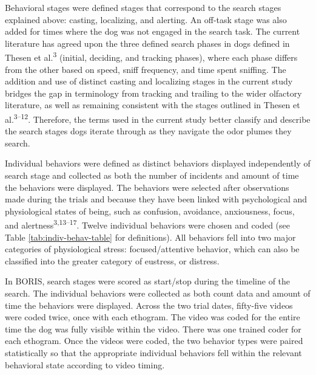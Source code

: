 \documentclass[
]{article}
\begin{document}
Behavioral stages were defined stages that correspond to the search stages explained above: casting, localizing, and alerting. An off-task stage was also added for times where the dog was not engaged in the search task. The current literature has agreed upon the three defined search phases in dogs defined in Thesen et al.\textsuperscript{3} (initial, deciding, and tracking phases), where each phase differs from the other based on speed, sniff frequency, and time spent sniffing. The addition and use of distinct casting and localizing stages in the current study bridges the gap in terminology from tracking and trailing to the wider olfactory literature, as well as remaining consistent with the stages outlined in Thesen et al.\textsuperscript{3--12}. Therefore, the terms used in the current study better classify and describe the search stages dogs iterate through as they navigate the odor plumes they search.

Individual behaviors were defined as distinct behaviors displayed independently of search stage and collected as both the number of incidents and amount of time the behaviors were displayed. The behaviors were selected after observations made during the trials and because they have been linked with psychological and physiological states of being, such as confusion, avoidance, anxiousness, focus, and alertness\textsuperscript{3,13--17}. Twelve individual behaviors were chosen and coded (see Table \ref{tab:indiv-behav-table} for definitions). All behaviors fell into two major categories of physiological stress: focused/attentive behavior, which can also be classified into the greater category of eustress, or distress.

In BORIS, search stages were scored as start/stop during the timeline of the search. The individual behaviors were collected as both count data and amount of time the behaviors were displayed. Across the two trial dates, fifty-five videos were coded twice, once with each ethogram. The video was coded for the entire time the dog was fully visible within the video. There was one trained coder for each ethogram. Once the videos were coded, the two behavior types were paired statistically so that the appropriate individual behaviors fell within the relevant behavioral state according to video timing.
\end{document}
